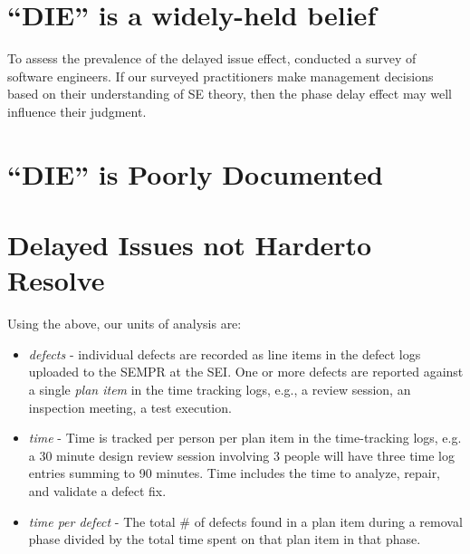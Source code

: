 \documentclass{sig-alternate}
\newcommand{\todo}[1]{\textcolor{Maroon}{TODO: #1}}
\newcommand{\bi}{\begin{itemize}}%
\newcommand{\ei}{\end{itemize}}
\newcommand{\fig}[1]{Figure~\ref{fig:#1}}
\begin{document}
\section{``DIE'' is a  widely-held belief}
To assess the prevalence of the delayed issue effect,   conducted a survey of software engineers. If our surveyed practitioners make management decisions based on their
understanding of SE theory, then the phase delay effect may well influence their judgment.



\section{``DIE'' is Poorly  Documented}
 










%
 

\section{Delayed Issues not Harder\newline to Resolve}





Using the above,
our units of analysis are:
\bi
    \item \emph{defects} - individual defects are recorded as line items in the defect logs uploaded to the SEMPR at the SEI. One or more defects are reported against a single \emph{plan item} in the time tracking logs, e.g., a review session, an inspection meeting, a test execution.
    \item \emph{time} - Time is tracked per person per plan item in the time-tracking logs, e.g. a 30 minute design review session involving 3 people will have three time log entries summing to 90 minutes. Time includes the time to analyze, repair, and validate a defect fix.
    \item \emph{time per defect} - The total \# of defects found in a plan item during a removal phase divided by the total time spent on that plan item in that phase.
\ei


\end{document}
